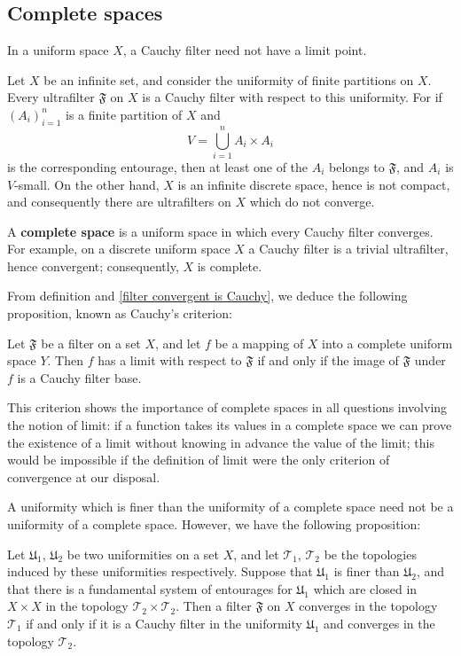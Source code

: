 \subsection{Complete spaces}
In a uniform space $X$, a Cauchy filter need not have a limit point.
\begin{example}
Let $X$ be an infinite set, and consider the uniformity of finite partitions on $X$. Every ultrafilter $\mathfrak{F}$ on $X$ is a Cauchy filter with respect to this uniformity. For if $(A_i)_{i=1}^{n}$ is a finite partition of $X$ and
\[V=\bigcup_{i=1}^{n}A_i\times A_i\]
is the corresponding entourage, then at least one of the $A_i$ belongs to $\mathfrak{F}$, and $A_i$ is $V$-small. On the other hand, $X$ is an infinite discrete space, hence is not compact, and consequently there are ultrafilters on $X$ which do not converge.
\end{example}
A \textbf{complete space} is a uniform space in which every Cauchy filter converges. For example, on a discrete uniform space $X$ a Cauchy filter is a trivial ultrafilter, hence convergent; consequently, $X$ is complete.\par
From definition and \cref{filter convergent is Cauchy}, we deduce the following proposition, known as Cauchy's criterion:
\begin{proposition}
Let $\mathfrak{F}$ be a filter on a set $X$, and let $f$ be a mapping of $X$ into a complete uniform space $Y$. Then $f$ has a limit with respect to $\mathfrak{F}$ if and only if the image of $\mathfrak{F}$ under $f$ is a Cauchy filter base.
\end{proposition}
This criterion shows the importance of complete spaces in all questions involving the notion of limit: if a function takes its values in a complete space we can prove the existence of a limit without knowing in advance the value of the limit; this would be impossible if the definition of limit were the only criterion of convergence at our disposal.\par
A uniformity which is finer than the uniformity of a complete space need not be a uniformity of a complete space. However, we have the following proposition:
\begin{proposition}\label{uniformity finer topology converge filter iff}
Let $\mathfrak{U}_1$, $\mathfrak{U}_2$ be two uniformities on a set $X$, and let $\mathcal{T}_1$, $\mathcal{T}_2$ be the topologies induced by these uniformities respectively. Suppose that $\mathfrak{U}_1$ is finer than $\mathfrak{U}_2$, and that there is a fundamental system of entourages for $\mathfrak{U}_1$ which are closed in $X\times X$ in the topology $\mathcal{T}_2\times\mathcal{T}_2$. Then a filter $\mathfrak{F}$ on $X$ converges in the topology $\mathcal{T}_1$ if and only if it is a Cauchy filter in the uniformity $\mathfrak{U}_1$ and converges in the topology $\mathcal{T}_2$.
\end{proposition}
